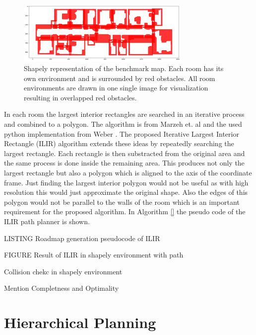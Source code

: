 \begin{figure}[h]
    \centering
    \includegraphics[width=0.75\textwidth]{figures/50_implementation/ruy_shapely.png}
    \caption[Shapely representation of the benchmark map]{Shapely representation of the benchmark map. Each room has its own environment and is surrounded by red obstacles. All room environments are drawn in one single image for visualization resulting in overlapped red obstacles.}
    \label{fig:ryu_shapely}
\end{figure}

In each room the largest interior rectangles are searched in an iterative process and combined to a polygon. The algorithm is from Marzeh et. al \cite{marzeh_algorithm_2019} and the used python implementation from Weber \cite{weber_largest_2023}. The proposed Iterative Largest Interior Rectangle (ILIR) algorithm extends these ideas by repeatedly searching the largest rectangle. Each rectangle is then substracted from the original area and the same process is done inside the remaining area. This produces not only the largest rectangle but also a polygon which is aligned to the axis of the coordinate frame. Just finding the largest interior polygon would not be useful as with high resolution this would just approximate the original shape. Also the edges of this polygon would not be parallel to the walls of the room which is an important requirement for the proposed algorithm. In Algorithm \ref{} the pseudo code of the ILIR path planner is shown.

LISTING Roadmap generation pseudocode of ILIR

FIGURE Result of ILIR in shapely environment with path 

Collision chekc in shapely environment

Mention Completness and Optimality

\section{Hierarchical Planning}
\label{sec:impl_hierarchical_planning}


